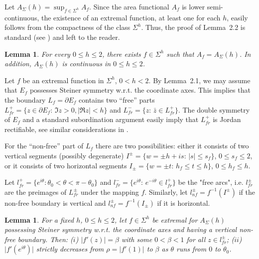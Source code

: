 \documentclass[11pt]{pjm}
\newtheorem{lemma}[theorem]{Lemma}
\newcommand{\abs}[1]{\lvert#1\rvert}
\newcommand{\bl}{\begin{lemma}}
\newcommand{\el}{\end{lemma}}
\newcommand{\U}{{\mathbb{U}}}
\begin{document}
Let $A_\Sigma(h)=\sup_{f\in \Sigma^h} A_f.$ 
Since the area functional  $A_f$ is lower semi-continuous, the existence of an 
extremal function, at least one   for each $h$, easily follows from the compactness of the class $\Sigma^h$.
Thus, the proof of Lemma~2.2 is standard (see \cite{BPS, BS}) and left to the reader.

\bl
For every $0\le h\le 2$, there exists $f \in \Sigma^h$ such that $A_f = A_\Sigma(h)$.  In addition, $A_\Sigma(h)$ is continuous  in $0\le h\le 2$.
\el





\medskip

Let $f$ be an extremal function in $\Sigma^h$, $0<h<2$. By Lemma~2.1, we may assume that 
$E_f$ possesses Steiner symmetry w.r.t. the 
coordinate axes. This implies that the boundary $L_f=\partial E_f$
contains  two ``free'' parts $L_{fr}^+=\{z\in \partial E_f:\,\Im z>0, |\Re z|<h\}$ and $L_{fr}^-=\{z:\, \bar z\in L_{fr}^+\}$.
The double symmetry of $E_f$ and a standard subordination argument
easily imply that $L_{fr}^+$ is Jordan rectifiable, see similar considerations in \cite{BPS}.

For the ``non-free'' part of $L_f$ there are two possibilities: either it consists of two vertical segments (possibly degenerate)
$I^{\pm}=\{w=\pm h +is:\, |s|\le s_f\}$, $0\le s_f\le 2$, or it consists of two horizontal  segments $I_{\pm}=\{w=\pm t:\, h_f\le t\le h\}$,
$0\le h_f\le h$.


Let $l^+_{fr} = \{ e^{i\theta}: \theta_0<\theta<\pi-\theta_0\}$  and $l^-_{fr}=\{e^{i\theta}:\, e^{-i\theta}\in l^+_{fr}\}$
be the "free arcs", i.e. $l^{\pm}_{fr}$ are the preimages of $L^{\pm}_{fr}$ under the mapping $f$.
Similarly, let   $l_{nf}^{\pm}=f^{-1}(I^{\pm})$ if the non-free boundary is vertical and $l_{nf}^{\pm}=f^{-1}(I_{\pm})$ if it is horizontal. 






\bl
For a fixed $h$, $0\le h\le 2$, let $f\in \Sigma^h$ be  extremal for $A_\Sigma(h)$ possessing Steiner symmetry w.r.t. the coordinate axes
and having a vertical non-free boundary. 
Then:
  ($i$) $\abs{f'(z)} = \beta$  with some $0<\beta <1$ for all  $z \in l^{\pm}_{fr}$; 
($ii$) $\abs{f'(e^{ i\theta})}$  strictly decreases from $\rho=|f'(1)|$ to $\beta$ as $\theta$ runs from $0$ to $\theta_0$.
\el
\end{document}
